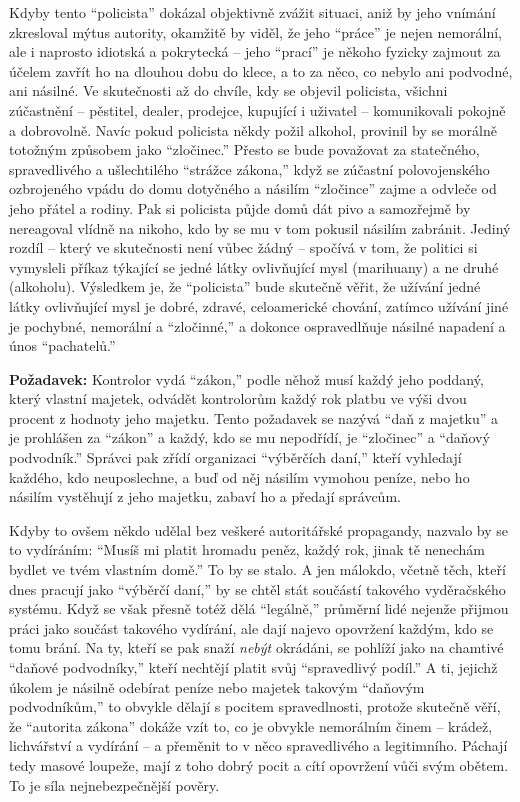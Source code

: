 \documentclass{book}
\begin{document}
Kdyby tento \enquote{policista} dokázal objektivně zvážit situaci, aniž by jeho vnímání zkresloval mýtus autority, okamžitě by viděl, že jeho \enquote{práce} je nejen nemorální, ale i naprosto idiotská a pokrytecká -- jeho \enquote{prací} je někoho fyzicky zajmout za účelem zavřít ho na dlouhou dobu do klece, a to za něco, co nebylo ani podvodné, ani násilné. Ve skutečnosti až do chvíle, kdy se objevil policista, všichni zúčastnění -- pěstitel, dealer, prodejce, kupující i uživatel -- komunikovali pokojně a dobrovolně. Navíc pokud policista někdy požil alkohol, provinil by se morálně totožným způsobem jako \enquote{zločinec.} Přesto se bude považovat za statečného, spravedlivého a ušlechtilého \enquote{strážce zákona,} když se zúčastní polovojenského ozbrojeného vpádu do domu dotyčného a násilím \enquote{zločince} zajme a odvleče od jeho přátel a rodiny. Pak si policista půjde domů dát pivo a samozřejmě by nereagoval vlídně na nikoho, kdo by se mu v tom pokusil násilím zabránit. Jediný rozdíl -- který ve skutečnosti není vůbec žádný -- spočívá v tom, že politici si vymysleli příkaz týkající se jedné látky ovlivňující mysl (marihuany) a ne druhé (alkoholu). Výsledkem je, že \enquote{policista} bude skutečně věřit, že užívání jedné látky ovlivňující mysl je dobré, zdravé, celoamerické chování, zatímco užívání jiné je pochybné, nemorální a \enquote{zločinné,} a dokonce ospravedlňuje násilné napadení a únos \enquote{pachatelů.}

\textbf{Požadavek:} Kontrolor vydá \enquote{zákon,} podle něhož musí každý jeho poddaný, který vlastní majetek, odvádět kontrolorům každý rok platbu ve výši dvou procent z hodnoty jeho majetku. Tento požadavek se nazývá \enquote{daň z majetku} a je prohlášen za \enquote{zákon} a každý, kdo se mu nepodřídí, je \enquote{zločinec} a \enquote{daňový podvodník.} Správci pak zřídí organizaci \enquote{výběrčích daní,} kteří vyhledají každého, kdo neuposlechne, a buď od něj násilím vymohou peníze, nebo ho násilím vystěhují z jeho majetku, zabaví ho a předají správcům.

Kdyby to ovšem někdo udělal bez veškeré autoritářské propagandy, nazvalo by se to vydíráním: \enquote{Musíš mi platit hromadu peněz, každý rok, jinak tě nenechám bydlet ve tvém vlastním domě.} To by se stalo. A jen málokdo, včetně těch, kteří dnes pracují jako \enquote{výběrčí daní,} by se chtěl stát součástí takového vyděračského systému. Když se však přesně totéž dělá \enquote{legálně,} průměrní lidé nejenže přijmou práci jako součást takového vydírání, ale dají najevo opovržení každým, kdo se tomu brání. Na ty, kteří se pak snaží \emph{nebýt} okrádáni, se pohlíží jako na chamtivé \enquote{daňové podvodníky,} kteří nechtějí platit svůj \enquote{spravedlivý podíl.} A ti, jejichž úkolem je násilně odebírat peníze nebo majetek takovým \enquote{daňovým podvodníkům,} to obvykle dělají s pocitem spravedlnosti, protože skutečně věří, že \enquote{autorita zákona} dokáže vzít to, co je obvykle nemorálním činem -- krádež, lichvářství a vydírání -- a přeměnit to v něco spravedlivého a legitimního. Páchají tedy masové loupeže, mají z toho dobrý pocit a cítí opovržení vůči svým obětem. To je síla nejnebezpečnější pověry.
\end{document}

